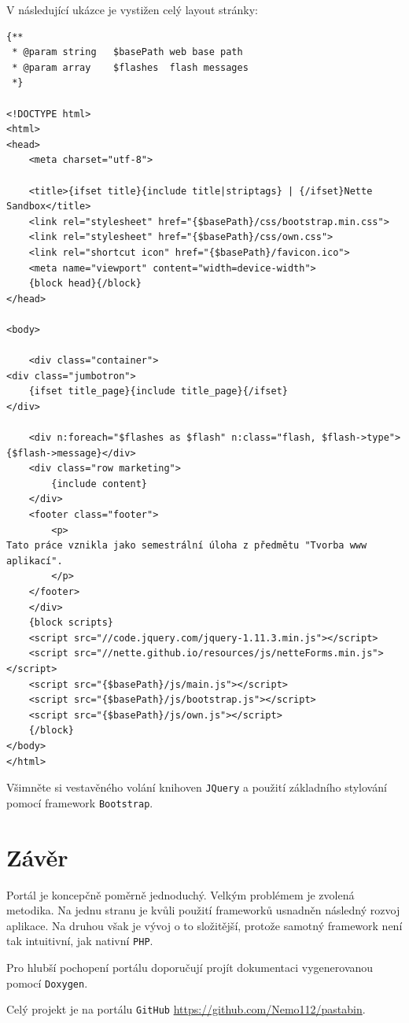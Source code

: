 \documentclass[a4paper,10pt]{report}
\begin{document}
V následující ukázce je vystižen celý layout stránky:

\begin{verbatim}
{**
 * @param string   $basePath web base path
 * @param array    $flashes  flash messages
 *}

<!DOCTYPE html>
<html>
<head>
	<meta charset="utf-8">

	<title>{ifset title}{include title|striptags} | {/ifset}Nette Sandbox</title>
	<link rel="stylesheet" href="{$basePath}/css/bootstrap.min.css">
	<link rel="stylesheet" href="{$basePath}/css/own.css">
	<link rel="shortcut icon" href="{$basePath}/favicon.ico">
	<meta name="viewport" content="width=device-width">
	{block head}{/block}
</head>

<body>

    <div class="container">
<div class="jumbotron">
	{ifset title_page}{include title_page}{/ifset}
</div>

	<div n:foreach="$flashes as $flash" n:class="flash, $flash->type">{$flash->message}</div>
	<div class="row marketing">
		{include content}
	</div>
 	<footer class="footer">
		<p>
Tato práce vznikla jako semestrální úloha z předmětu "Tvorba www aplikací".
		</p>
	</footer>
    </div>
	{block scripts}
	<script src="//code.jquery.com/jquery-1.11.3.min.js"></script>
	<script src="//nette.github.io/resources/js/netteForms.min.js"></script>
	<script src="{$basePath}/js/main.js"></script>
	<script src="{$basePath}/js/bootstrap.js"></script>
	<script src="{$basePath}/js/own.js"></script>
	{/block}
</body>
</html>
\end{verbatim}

Všimněte si vestavěného volání knihoven \texttt{JQuery} a použití základního stylování pomocí framework \texttt{Bootstrap}.

\chapter{Závěr}

Portál je koncepčně poměrně jednoduchý. Velkým problémem je zvolená metodika. Na jednu stranu je kvůli použití frameworků usnadněn následný rozvoj aplikace. Na druhou však je vývoj o to složitější, protože samotný framework není tak intuitivní, jak nativní \texttt{PHP}.

Pro hlubší pochopení portálu doporučují projít dokumentaci vygenerovanou pomocí \texttt{Doxygen}.

Celý projekt je na portálu \texttt{GitHub} \url{https://github.com/Nemo112/pastabin}.
\end{document}
